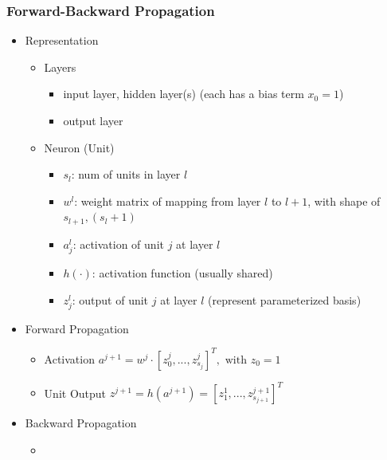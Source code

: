 \subsubsection{Forward-Backward Propagation}
\begin{itemize}
\item Representation
	\begin{itemize}
	\item Layers
		\begin{itemize}
		\item input layer, hidden layer(s) (each has a bias term $x_0=1$)
		\item output layer
		\end{itemize}
	\item Neuron (Unit)
		\begin{itemize}
		\item $s_l$: num of units in layer $l$
		\item $w^l$: weight matrix of mapping from layer $l$ to $l+1$, with shape of $s_{l+1}, (s_l + 1)$
		\item $a_j^l$: activation of unit $j$ at layer $l$
		\item $h(\cdot)$: activation function (usually shared)
		\item $z_j^l$: output of unit $j$ at layer $l$ (represent parameterized basis)
		\end{itemize}
	\end{itemize}
\item Forward Propagation
	\begin{itemize}
	\item Activation $a^{j+1} = w^j \cdot [z_0^j, ..., z_{s_j}^j]^T, \text{ with } z_0=1$
	\item Unit Output $z^{j+1} = h(a^{j+1}) = [z_1^{1}, ..., z^{j+1}_{s_{j+1}}]^T$
	\end{itemize}

\item Backward Propagation
	\begin{itemize}
	\item
	\end{itemize}

\end{itemize}


\subsubsection{}
